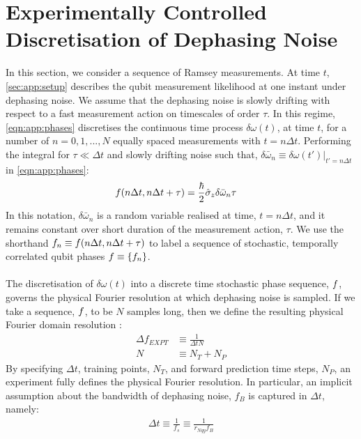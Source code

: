 \section{Experimentally Controlled Discretisation of Dephasing Noise \label{sec:app:exptres}} 
 In this section, we consider a sequence of Ramsey measurements. At time $t$, \cref{sec:app:setup} describes the qubit measurement likelihood at one instant under dephasing noise. We assume that the dephasing noise is slowly drifting with respect to a fast measurement action on timescales of order $\tau$. In this regime, \cref{eqn:app:phases} discretises the continuous time process $\delta\omega(t)$, at time $t$, for a number of $n= 0, 1, ..., N$ equally spaced measurements with $t = n \Delta t$. Performing the integral for $\tau \ll \Delta t$ and slowly drifting noise such that, $\delta\bar{\omega}_n \equiv \delta\omega(t')|_{t'=n \Delta t }$ in \cref{eqn:app:phases}:
\begin{align}
f(n\Delta t, n\Delta t + \tau) & = \frac{\hbar}{2}\hat{\sigma}_{z}\delta\bar{\omega}_n \tau \label{eqn:app:phases_constantdetuning}
\end{align}
In this notation, $\delta\bar{\omega}_n $ is a random variable realised at time, $t = n \Delta t$, and it remains constant over short duration of the measurement action, $\tau$.  We use the shorthand $f_n \equiv f(n\Delta t, n\Delta t + \tau)$ to label a sequence of stochastic, temporally correlated qubit phases $ f \equiv \{f_n \}$. 
 \\
 \\
 The discretisation of $\delta\omega(t)$ into  a discrete time stochastic phase sequence, $f$, governs the physical Fourier resolution at which dephasing noise is sampled. If we take a sequence, $f$, to be $N$ samples long, then we define the resulting physical Fourier domain resolution :
 \begin{align}
 \Delta f_{EXPT} & \equiv \frac{1}{\Delta t N} \\
 N & \equiv N_T + N_P
 \end{align} By specifying  $\Delta t$, training points, $ N_T$, and forward prediction time steps, $ N_P$, an experiment fully defines the physical Fourier resolution. In particular, an implicit assumption about the bandwidth of dephasing noise, $f_B$ is captured in $\Delta t$, namely:
\begin{align}
\Delta t \equiv \frac{1}{f_s} \equiv \frac{1}{r_{Nqy}f_B}
 \end{align}
